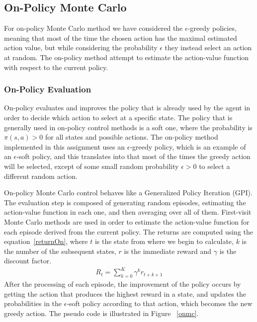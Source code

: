 \documentclass[paper=a4, fontsize=11pt]{scrartcl}
\numberwithin{equation}{section}		%
\numberwithin{figure}{section}			%
\numberwithin{table}{section}				%
\begin{document}
\subsection{\textbf {On-Policy Monte Carlo}}
For on-policy Monte Carlo method we have considered the $\epsilon$-greedy policies, meaning that most of the time the chosen action has the maximal estimated action value, but while considering the probability $\epsilon$ they instead select an action at random. The on-policy method attempt  to estimate the action-value function with respect to the current policy.

\subsubsection*{On-Policy Evaluation}
On-policy evaluates and improves the policy that is already used by the agent in order to decide which action to select at a specific state. The policy that is generally used in on-policy control methods is a soft one, where the probability is $\pi(s,a) > 0$ for all states and possible actions. The on-policy method implemented in this assignment uses an $\epsilon$-greedy policy, which is an example of an $\epsilon$-soft policy, and this translates into that most of the times the greedy action will be selected, except of some small random probability $\epsilon > 0$ to select a different random action.

On-policy Monte Carlo control behaves like a Generalized Policy Iteration (GPI). The evaluation step is composed of generating random episodes, estimating the action-value function in each one, and then averaging over all of them. First-visit Monte Carlo methods are used in order to estimate the action-value function for each episode derived from the current policy. The returns are computed using the equation~\ref{returnOn}, where $t$ is the state from where we begin to calculate, $k$ is the number of the subsequent states, $r$ is the immediate reward and $\gamma$ is the discount factor.
\begin{align}
R_t = \sum_{k=0}^{K}\gamma^k r_{t+k+1} \label{returnOn}
\end{align}
After the processing of each episode, the improvement of the policy occurs by getting the action that produces the highest reward in a state, and updates the probabilities in the $\epsilon$-soft policy according to that action, which becomes the new greedy action. The pseudo code is illustrated in Figure ~\ref{onmc}.
\end{document}
